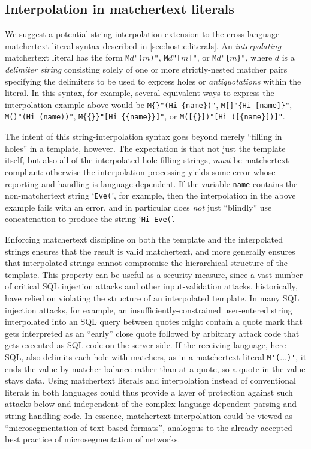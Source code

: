 \subsection{Interpolation in matchertext literals}
\label{app:interp:lit}

We suggest a potential string-interpolation extension
to the cross-language matchertext literal syntax
described in \cref{sec:host:c:literals}.
An \emph{interpolating} matchertext literal has the form
\verb|M|$d$\verb|"(|$m$\verb|)"|,
\verb|M|$d$\verb|"[|$m$\verb|]"|, or
\verb|M|$d$\verb|"{|$m$\verb|}"|,
where $d$ is a \emph{delimiter string}
consisting solely of one or more strictly-nested matcher pairs
specifying the delimiters to be used to express holes or \emph{antiquotations}
within the literal.
In this syntax, for example,
several equivalent ways to express the interpolation example above
would be
\verb|M{}"(Hi {name})"|,
\verb|M[]"{Hi [name]}"|,
\verb|M()"(Hi (name))"|,
\verb|M{{}}"[Hi {{name}}]"|, or
\verb|M([{}])"[Hi ([{name}])]"|.

The intent of this string-interpolation syntax
goes beyond merely ``filling in holes'' in a template, however.
The expectation is that not just the template itself,
but also all of the interpolated hole-filling strings,
\emph{must} be matchertext-compliant:
otherwise the interpolation processing yields
some error whose reporting and handling is language-dependent.
If the variable \verb|name| contains
the non-matchertext string `\verb|Eve(|', for example,
then the interpolation in the above example fails with an error,
and in particular does \emph{not} just ``blindly'' use concatenation
to produce the string `\verb|Hi Eve(|'.

Enforcing matchertext discipline on both the template
and the interpolated strings
ensures that the result is valid matchertext,
and more generally ensures that interpolated strings
cannot compromise the hierarchical structure of the template.
This property can be useful as a security measure,
since a vast number of critical SQL injection attacks
and other input-validation attacks, historically,
have relied on violating the structure of an interpolated template.
In many SQL injection attacks, for example,
an insufficiently-constrained user-entered string
interpolated into an SQL query between quotes
might contain a quote mark that gets interpreted
as an ``early'' close quote followed by arbitrary attack code
that gets executed as SQL code on the server side.
If the receiving language, here SQL,
also delimits each hole with matchers,
as in a matchertext literal \verb|M'(|$\dots$\verb|)'|,
it ends the value by matcher balance rather than at a quote,
so a quote in the value stays data.
Using matchertext literals and interpolation
instead of conventional literals
in both languages
could thus provide a layer of protection against such attacks
below and independent of
the complex language-dependent parsing and string-handling code.
In essence, matchertext interpolation could be viewed
as ``microsegmentation of text-based formats'',
analogous to the already-accepted best practice
of microsegmentation of networks.

